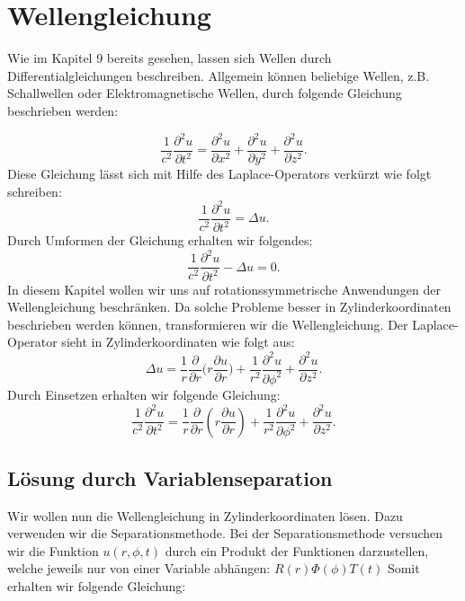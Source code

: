 \section{Wellengleichung}


Wie im Kapitel 9 bereits gesehen, lassen sich Wellen durch Differentialgleichungen beschreiben. Allgemein können beliebige Wellen, z.B. Schallwellen oder Elektromagnetische Wellen, durch folgende Gleichung beschrieben werden:

\begin{equation}
\frac{1}{c^2} \frac{\partial^2 u}{\partial t^2} = \frac{\partial^2 u}{\partial x^2} + \frac{\partial^2 u}{\partial y^2} + \frac{\partial^2 u}{\partial z^2}.
\end{equation}
Diese Gleichung lässt sich mit Hilfe des Laplace-Operators verkürzt wie folgt schreiben:%
\begin{equation}
\frac{1}{c^2} \frac{\partial^2 u}{\partial t^2} = \Delta u.
\end{equation}
Durch Umformen der Gleichung erhalten wir folgendes:
\begin{equation}
\frac{1}{c^2} \frac{\partial^2 u}{\partial t^2} - \Delta u = 0.
\end{equation}
In diesem Kapitel wollen wir uns auf rotationssymmetrische Anwendungen der Wellengleichung beschränken. Da solche Probleme besser in Zylinderkoordinaten beschrieben werden können, transformieren wir die Wellengleichung. Der Laplace-Operator sieht in Zylinderkoordinaten wie folgt aus:
\begin{equation}
\Delta u = \frac{1}{r} \frac{\partial}{\partial r}\biggl(r \frac{\partial u}{\partial r}\biggr) + \frac{1}{r^2} \frac{\partial^2 u}{\partial \phi^2} + \frac{\partial^2 u}{\partial z^2}.
\end{equation} 
Durch Einsetzen erhalten wir folgende Gleichung:
\begin{equation}
\frac{1}{c^2} \frac{\partial^2 u}{\partial t^2} = \frac{1}{r} \frac{\partial}{\partial r}(r \frac{\partial u}{\partial r}) + \frac{1}{r^2} \frac{\partial^2 u}{\partial \phi^2} + \frac{\partial^2 u}{\partial z^2}.
\end{equation}

\subsection[Lösung durch Variablenseparation]{Lösung durch Variablenseparation}

Wir wollen nun die Wellengleichung in Zylinderkoordinaten lösen. Dazu verwenden wir die Separationsmethode.
Bei der Separationsmethode versuchen wir die Funktion $u(r, \phi, t)$ durch ein Produkt der Funktionen darzustellen, welche jeweils nur von einer Variable abhängen: $R(r)\Phi(\phi)T(t)$
Somit erhalten wir folgende Gleichung:

